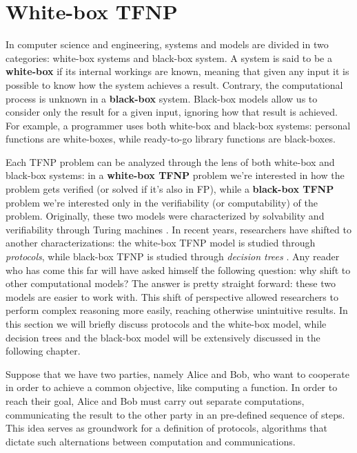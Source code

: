 \newpage

\section{White-box \textsf{TFNP}}

In computer science and engineering, systems and models are divided in two categories: white-box systems and black-box system. A system is said to be a \textbf{white-box} if  its internal workings are known, meaning that given any input it is possible to know how the system achieves a result. Contrary, the computational process is unknown in a \textbf{black-box} system. Black-box models allow us to consider only the result for a given input, ignoring how that result is achieved. For example, a programmer uses both white-box and black-box systems: personal functions are white-boxes, while ready-to-go library functions are black-boxes.

Each \textsf{TFNP} problem can be analyzed through the lens of both white-box and black-box systems: in a \textbf{white-box \textsf{TFNP}} problem we're interested in how the problem gets verified (or solved if it's also in \textsf{FP}), while a \textbf{black-box \textsf{TFNP}} problem we're interested only in the verifiability (or computability) of the problem. Originally, these two models were characterized by solvability and verifiability through Turing machines \cite{decision_vs_search,rel_comp_np_search}. In recent years, researchers have shifted to another characterizations: the white-box \textsf{TFNP} model is studied through \textit{protocols}, while black-box \textsf{TFNP} is studied through \textit{decision trees} \cite{separations_proof_complexity, adventures_monotone_tfnp, tfnp_characterization}. Any reader who has come this far will have asked himself the following question: why shift to other computational models? The answer is pretty straight forward: these two models are easier to work with. This shift of perspective allowed researchers to perform complex reasoning more easily, reaching otherwise unintuitive results. In this section we will briefly discuss protocols and the white-box model, while decision trees and the black-box model will be extensively discussed in the following chapter. 

Suppose that we have two parties, namely Alice and Bob, who want to cooperate in order to achieve a common objective, like computing a function. In order to reach their goal, Alice and Bob must carry out separate computations, communicating the result to the other party in an pre-defined sequence of steps. This idea serves as groundwork for a definition of protocols, algorithms that dictate such alternations between computation and communications. 

